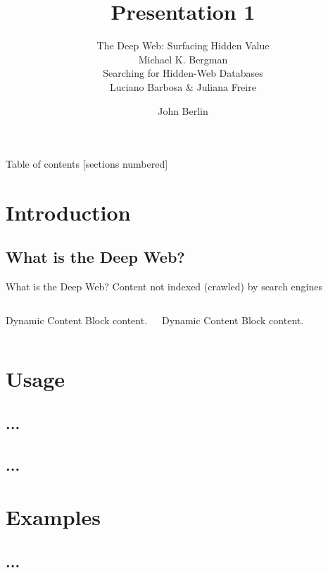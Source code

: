 \documentclass[mathserif,serif,pdf]{beamer}
\author{John Berlin}
\subtitle{
\normalsize{The Deep Web: Surfacing Hidden Value} \\  \footnotesize{Michael K. Bergman} \\ 
\normalsize{Searching for Hidden-Web Databases} \\ \footnotesize{Luciano Barbosa \& Juliana Freire}
}
\title{Presentation 1}
\institute{Old Dominion University \\ Introduction to Information Retrieval \\ CS734/834   }
\begin{document}
\begin{frame}
  \titlepage
\end{frame}

\begin{frame}{Table of contents}
  [sections numbered]
  \tableofcontents
\end{frame}



\section{Introduction}
\subsection{What is the Deep Web?}
\begin{frame}{What is the Deep Web?}
Content not indexed (crawled) by search engines
\begin{columns}[T,onlytextwidth]
      \begin{block}{ Dynamic Content}
          Block content.
      \end{block}
		 
	\begin{block}{ Dynamic Content}
        Block content.
      \end{block}
    

      \end{columns}
	     

\end{frame}
\section{Usage}
\subsection{...}
\subsection{...}
\section{Examples}
\subsection{...}

\begin{frame}
\end{frame} %
\end{document}
